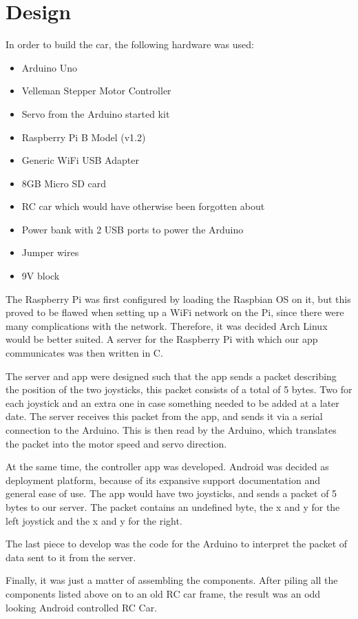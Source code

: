 \section{Design}
\par
In order to build the car, the following hardware was used:
\begin{itemize}
\item Arduino Uno
\item Velleman Stepper Motor Controller
\item Servo from the Arduino started kit
\item Raspberry Pi B Model (v1.2)
\item Generic WiFi USB Adapter
\item 8GB Micro SD card
\item RC car which would have otherwise been forgotten about
\item Power bank with 2 USB ports to power the Arduino
\item Jumper wires
\item 9V block
\end{itemize}
The Raspberry Pi was first configured by loading the Raspbian OS on it, but this proved to be flawed when setting up a WiFi network on the Pi, since there were many complications with the network. Therefore, it was decided Arch Linux would be better suited. A server for the Raspberry Pi with which our app communicates was then written in C.

The server and app were designed such that the app sends a packet describing the position of the two joysticks, this packet consists of a total of 5 bytes. Two for each joystick and an extra one in case something needed to be added at a later date. The server receives this packet from the app, and sends it via a serial connection to the Arduino. This is then read by the Arduino, which translates the packet into the motor speed and servo direction.

At the same time, the controller app was developed. Android was decided as deployment platform, because of its expansive support documentation and general ease of use. The app would have two joysticks, and sends a packet of 5 bytes to our server. The packet contains an undefined byte, the x and y for the left joystick and the x and y for the right.

The last piece to develop was the code for the Arduino to interpret the packet of data sent to it from the server.

Finally, it was just a matter of assembling the components. After piling all the components listed above on to an old RC car frame, the result was an odd looking Android controlled RC Car.
